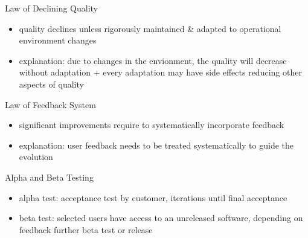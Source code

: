 \begin{frame}{\insertsubsection}
	\begin{fancycolumns}
		\begin{definition}{Law of Declining Quality\mysource{\lehmanslaws}}
			\begin{itemize}
				\item quality declines unless rigorously maintained \& adapted to operational environment changes %
				\item explanation: due to changes in the envionment, the quality will decrease without adaptation + every adaptation may have side effects reducing other aspects of quality
			\end{itemize}
		\end{definition}
		\newtrafficsignsexample
		\nextcolumn
		\begin{definition}{Law of Feedback System\mysource{\lehmanslaws}}
			\begin{itemize}
				\item significant improvements require to systematically incorporate feedback %
				\item explanation: user feedback needs to be treated systematically to guide the evolution
			\end{itemize}
		\end{definition}
		\begin{example}{Alpha and Beta Testing}
			\begin{itemize}
				\item alpha test: acceptance test by customer, iterations until final acceptance
				\item beta test: selected users have access to an unreleased software, depending on feedback further beta test or release
			\end{itemize}
		\end{example}
	\end{fancycolumns}
\end{frame}


